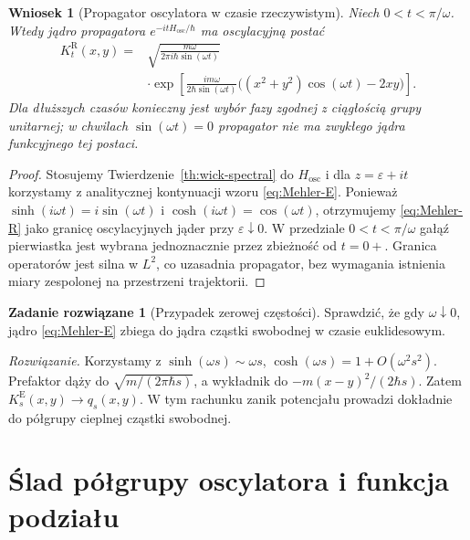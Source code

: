 \documentclass[11pt,a4paper,oneside]{report}
\numberwithin{equation}{chapter}
\theoremstyle{plain}
\newtheorem{wniosek}[twierdzenie]{Wniosek}
\theoremstyle{definition}
\newtheorem{zadanie}{Zadanie rozwiązane}[chapter]
\theoremstyle{remark}
\begin{document}
\begin{wniosek}[Propagator oscylatora w czasie rzeczywistym]
\label{cor:Mehler-real}
Niech $0<t<\pi/\omega$. Wtedy jądro propagatora
$e^{-itH_{\mathrm{osc}}/\hbar}$ ma oscylacyjną postać
\[
\begin{split}
 K_t^{\mathrm R}(x,y)
  ={}&\sqrt{\frac{m\omega}{2\pi i\hbar\sin(\omega t)}}\\
 &\cdot\exp\left[\frac{im\omega}{2\hbar\sin(\omega t)}
 \bigl((x^2+y^2)\cos(\omega t)-2xy\bigr)\right].
\end{split}
\tag{16.12}\label{eq:Mehler-R}
\]
Dla dłuższych czasów konieczny jest wybór fazy
zgodnej z ciągłością grupy unitarnej; w chwilach
$\sin(\omega t)=0$ propagator nie ma zwykłego jądra
funkcyjnego tej postaci.
\end{wniosek}
\begin{proof}
Stosujemy Twierdzenie~\ref{th:wick-spectral} do
$H_{\mathrm{osc}}$ i dla $z=\varepsilon+it$ korzystamy
z analitycznej kontynuacji wzoru \eqref{eq:Mehler-E}.
Ponieważ $\sinh(i\omega t)=i\sin(\omega t)$ i
$\cosh(i\omega t)=\cos(\omega t)$, otrzymujemy
\eqref{eq:Mehler-R} jako granicę oscylacyjnych jąder
przy $\varepsilon\downarrow0$. W przedziale
$0<t<\pi/\omega$ gałąź pierwiastka jest wybrana
jednoznacznie przez zbieżność od $t=0+$.
Granica operatorów jest silna w $L^2$, co uzasadnia
propagator, bez wymagania istnienia miary zespolonej
na przestrzeni trajektorii.
\end{proof}

\begin{zadanie}[Przypadek zerowej częstości]
Sprawdzić, że gdy $\omega\downarrow0$, jądro
\eqref{eq:Mehler-E} zbiega do jądra cząstki swobodnej
w czasie euklidesowym.

\emph{Rozwiązanie.} Korzystamy z
$\sinh(\omega s)\sim\omega s$,
$\cosh(\omega s)=1+O(\omega^2s^2)$.
Prefaktor dąży do $\sqrt{m/(2\pi\hbar s)}$,
a wykładnik do $-m(x-y)^2/(2\hbar s)$.
Zatem $K_s^{\mathrm E}(x,y)\to q_s(x,y)$.
W tym rachunku zanik potencjału prowadzi dokładnie do
półgrupy cieplnej cząstki swobodnej.
\end{zadanie}


\section{Ślad półgrupy oscylatora i funkcja podziału}
\end{document}
